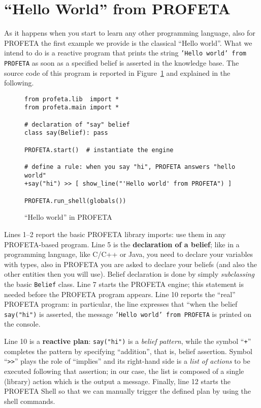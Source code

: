 \section{``Hello World'' from PROFETA}
As it happens when you start to learn any other programming language, also
for PROFETA the first example we provide is the classical ``Hello world''.
What we intend to do is a reactive program that prints the string
\texttt{'Hello world' from PROFETA} as soon as a specified belief is
asserted in the knowledge base.
The source code of this program is reported in
Figure~\ref{fig:hello} and explained in the following.

\begin{figure}[b!]
\python%
\begin{lstlisting}
from profeta.lib  import *
from profeta.main import *

# declaration of "say" belief
class say(Belief): pass

PROFETA.start()  # instantiate the engine

# define a rule: when you say "hi", PROFETA answers "hello world"
+say("hi") >> [ show_line("'Hello world' from PROFETA") ]

PROFETA.run_shell(globals())
\end{lstlisting}
\caption{``Hello world'' in PROFETA}\label{fig:hello}
\end{figure}


Lines 1--2 report the basic PROFETA library imports: use them in any
PROFETA-based program.
Line 5 is the \textbf{declaration of a belief}; like in a programming
language, like C/C++ or Java, you need to declare your variables with types, also in
PROFETA you are asked to declare your beliefs (and also the other entities
then you will use).
Belief declaration is done by simply \emph{subclassing} the basic
\texttt{Belief} class.
Line 7 starts the PROFETA engine; this statement is needed before
the PROFETA program appears.
Line 10 reports the ``real'' PROFETA program: in particular, the line
expresses that ``when the belief \texttt{say("hi")} is asserted, the
message \texttt{'Hello world' from PROFETA} is printed on the console.

Line 10 is a \textbf{reactive plan}: \texttt{say("hi")} is a \emph{belief
  pattern}, while the symbol ``\texttt{+}'' completes the pattern by
specifying ``addition'', that is, belief assertion.
Symbol ``\verb+>>+'' plays the role of ``implies'' and its right-hand side
is a \emph{list of actions} to be executed following that assertion; in our
case, the list is composed of a single (library) action which is the output
a message.
Finally, line 12 starts the PROFETA Shell so that we can manually trigger
the defined plan by using the shell commands.


